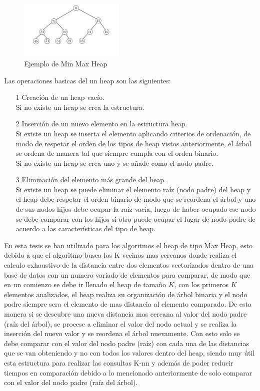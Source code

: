 \begin{itemize}
\begin{figure}[hbtp]
	\centering
	\includegraphics[width=5cm]{fig/Min-max_heap.png}
	\caption{\label{fig:minmaxheap} Ejemplo de Min Max Heap}
\end{figure} 	
\end{itemize} 

Las operaciones basicas del un heap son las siguientes:
\begin{itemize}
	\item[1] Creación de un heap vacío.\\
	Si no existe un heap se crea la estructura.
	\item[2] Inserción de un nuevo elemento en la estructura heap.\\
	Si existe un heap se inserta el elemento aplicando criterios de ordenación, de modo de respetar el orden de los tipos de heap vistos anteriormente, el árbol se ordena de manera tal que siempre cumpla con el orden binario.\\
	Si no existe un heap se crea uno y se añade como el nodo padre.
	\item[3] Eliminación del elemento más grande del heap.\\
	Si existe un heap se puede eliminar el elemento raíz (nodo padre) del heap y el heap debe respetar el orden binario de modo que se reordena el árbol y uno de sus nodos hijos debe ocupar la raíz vacía, luego de haber ocupado ese nodo se debe comparar con los hijos si otro puede ocupar el lugar de nodo padre de acuerdo a las características del tipo de heap. 
\end{itemize}

En esta tesis se han utilizado para los algoritmos el heap de tipo Max Heap, esto debido a que el algoritmo busca los K vecinos mas cercanos donde realiza el calculo exhaustivo de la distancia entre dos elementos vectorizados dentro de una base de datos con un numero variado de elementos para comparar, de modo que en un comienzo se debe ir llenado el heap de tamaño $K$, con los primeros $K$ elementos analizados, el heap realiza su organización de árbol binaria y el nodo padre siempre sera el elemento de mas distancia al elemento comparado. De esta manera si se descubre una nueva distancia mas cercana al valor del nodo padre (raíz del árbol), se procese a eliminar el valor del nodo actual y se realiza la inserción del nuevo valor y se reordena el árbol nuevamente. Con esto solo se debe comparar con el valor del nodo padre (raíz) con cada una de las distancias que se van obteniendo y no con todos los valores dentro del heap, siendo muy útil esta estructura para realizar las consultas K-nn y además de poder reducir tiempos en comparación debido a lo mencionado anteriormente de solo comparar con el valor del nodo padre (raíz del árbol). 


